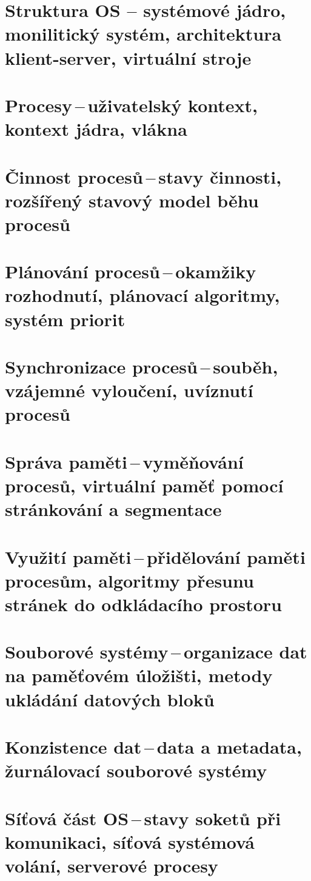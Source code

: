 \section{Struktura OS – systémové jádro, monilitický systém, architektura klient-server, virtuální stroje}

\newpage
\section{Procesy\,--\,uživatelský kontext, kontext jádra, vlákna}

\newpage
\section{Činnost procesů\,--\,stavy činnosti, rozšířený stavový model běhu procesů}

\newpage
\section{Plánování procesů\,--\,okamžiky rozhodnutí, plánovací algoritmy, systém priorit}

\newpage
\section{Synchronizace procesů\,--\,souběh, vzájemné vyloučení, uvíznutí procesů}

\newpage
\section{Správa paměti\,--\,vyměňování procesů, virtuální paměť pomocí stránkování a segmentace}

\newpage
\section{Využití paměti\,--\,přidělování paměti procesům, algoritmy přesunu stránek do odkládacího prostoru}

\newpage
\section{Souborové systémy\,--\,organizace dat na paměťovém úložišti, metody ukládání datových bloků}

\newpage
\section{Konzistence dat\,--\,data a metadata, žurnálovací souborové systémy}

\newpage
\section{Síťová část OS\,--\,stavy soketů při komunikaci, síťová systémová volání, serverové procesy}